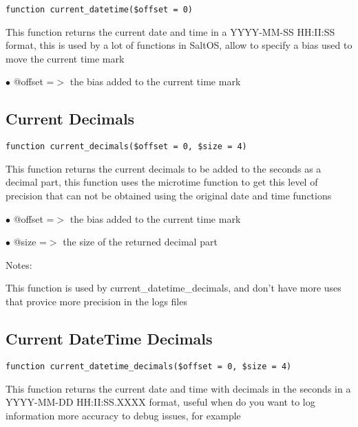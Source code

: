 \documentclass[a4paper]{book}
\begin{document}
\begin{lstlisting}
function current_datetime($offset = 0)
\end{lstlisting}

This function returns the current date and time in a YYYY-MM-SS HH:II:SS format,
this is used by a lot of functions in SaltOS, allow to specify a bias used to
move the current time mark

\begin{compactitem}
\item[\color{myblue}$\bullet$] @offset =$>$ the bias added to the current time mark
\end{compactitem}

\hypertarget{toc76}{}
\subsection{Current Decimals}

\begin{lstlisting}
function current_decimals($offset = 0, $size = 4)
\end{lstlisting}

This function returns the current decimals to be added to the seconds as a
decimal part, this function uses the microtime function to get this level of
precision that can not be obtained using the original date and time functions

\begin{compactitem}
\item[\color{myblue}$\bullet$] @offset =$>$ the bias added to the current time mark
\item[\color{myblue}$\bullet$] @size   =$>$ the size of the returned decimal part
\end{compactitem}

Notes:

This function is used by current\_datetime\_decimals, and don't have more uses
that provice more precision in the logs files

\hypertarget{toc77}{}
\subsection{Current DateTime Decimals}

\begin{lstlisting}
function current_datetime_decimals($offset = 0, $size = 4)
\end{lstlisting}

This function returns the current date and time with decimals in the seconds
in a YYYY-MM-DD HH:II:SS.XXXX format, useful when do you want to log information
more accuracy to debug issues, for example
\end{document}
